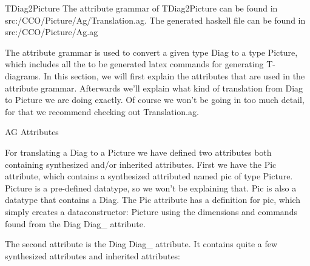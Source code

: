 \documentclass{article}
\begin{document}
\begin{subsection}{TDiag2Picture}
The attribute grammar of TDiag2Picture can be found in src:/CCO/Picture/Ag/Translation.ag.
The generated haskell file can be found in src:/CCO/Picture/Ag.ag

\hfill \break

The attribute grammar is used to convert a given type Diag to a type Picture, which includes all the to be generated latex commands for generating T-diagrams. In this section, we will first explain the attributes that are used in the attribute grammar. Afterwards we'll explain what kind of translation from Diag to Picture we are doing exactly. Of course we won't be going in too much detail, for that we recommend checking out Translation.ag.

\begin{subsubsection}{AG Attributes}

For translating a Diag to a Picture we have defined two attributes both containing synthesized and/or inherited attributes.
First we have the Pic attribute, which contains a synthesized attributed named pic of type Picture. Picture is a pre-defined datatype, so we won't be explaining that. Pic is also a datatype that contains a Diag. The Pic attribute has a definition for pic, which simply creates a dataconstructor: Picture using the dimensions and commands found from the Diag Diag\_ attribute.

\hfill \break
The second attribute is the Diag Diag\_ attribute. It contains quite a few synthesized attributes and inherited attributes:


\end{subsubsection}
\end{subsection}
\end{document}
